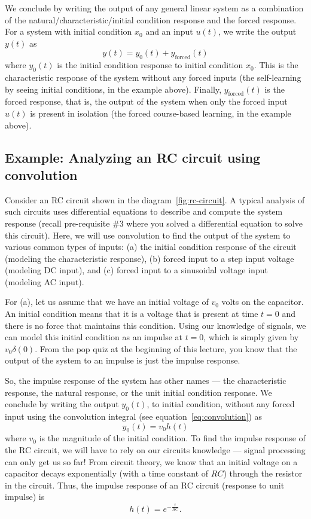 \documentclass{ee102_notes}
\begin{document}
We conclude by writing the output of any general linear system as a combination of the natural/characteristic/initial condition response and the forced response. For a system with initial condition $x_0$ and an input $u(t)$, we write the output $y(t)$ as
\[
y(t) = y_{0}(t) + y_{\text{forced}}(t)
\]
where $y_0(t)$ is the initial condition response to initial condition $x_0$. This is the characteristic response of the system without any forced inputs (the self-learning by seeing initial conditions, in the example above). Finally, $y_{\text{forced}}(t)$ is the forced response, that is, the output of the system when only the forced input $u(t)$ is present in isolation (the forced course-based learning, in the example above). 
\subsection{Example: Analyzing an RC circuit using convolution}
Consider an RC circuit shown in the diagram~\ref{fig:rc-circuit}. A typical analysis of such circuits uses differential equations to describe and compute the system response (recall pre-requisite \#3 where you solved a differential equation to solve this circuit). Here, we will use convolution to find the output of the system to various common types of inputs: (a) the initial condition response of the circuit (modeling the characteristic response), (b) forced input to a step input voltage (modeling DC input), and (c) forced input to a sinusoidal voltage input (modeling AC input). 

For (a), let us assume that we have an initial voltage of $v_0$ volts on the capacitor. An initial condition means that it is a voltage that is present at time $t = 0$ and there is no force that maintains this condition. Using our knowledge of signals, we can model this initial condition as an impulse at $t = 0$, which is simply given by $v_0\delta(0)$. From the pop quiz at the beginning of this lecture, you know that the output of the system to an impulse is just the impulse response. 

So, the impulse response of the system has other names --- the characteristic response, the natural response, or the unit initial condition response. We conclude by writing the output $y_{0}(t)$, to initial condition, without any forced input using the convolution integral (see equation~\eqref{eq:convolution}) as  
\[
y_0(t) = v_0 h(t)
\] 
where $v_0$ is the magnitude of the initial condition. To find the impulse response of the RC circuit, we will have to rely on our circuits knowledge --- signal processing can only get us so far! From circuit theory, we know that an initial voltage on a capacitor decays exponentially (with a time constant of $RC$) through the resistor in the circuit. Thus, the impulse response of an RC circuit (response to unit impulse) is 
\begin{equation}
\label{eq:h-rc}
h(t) = e^{-\frac{t}{RC}}.
\end{equation}
\end{document}
